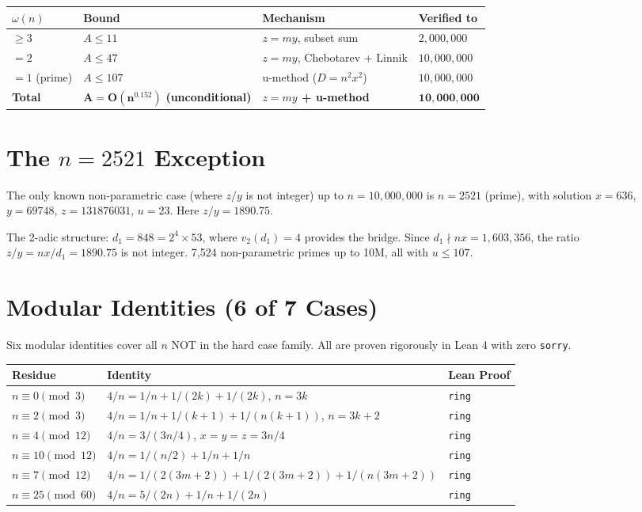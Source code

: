 \documentclass[11pt]{article}
\theoremstyle{remark}
\begin{document}
\begin{center}
\begin{tabular}{llll}
\toprule
$\omega(n)$ & Bound & Mechanism & Verified to \\
\midrule
$\geq 3$ & $A \leq 11$ & $z=my$, subset sum & $2{,}000{,}000$ \\
$= 2$ & $A \leq 47$ & $z=my$, Chebotarev + Linnik & $10{,}000{,}000$ \\
$= 1$ (prime) & $A \leq 107$ & u-method ($D = n^2 x^2$) & $10{,}000{,}000$ \\
\midrule
\textbf{Total} & $\boldsymbol{A = O(n^{0.152})}$ \textbf{(unconditional)} & \textbf{$z=my$ + u-method} & $\mathbf{10{,}000{,}000}$ \\
\bottomrule
\end{tabular}
\end{center}

\section{The $n = 2521$ Exception}

The only known non-parametric case (where $z/y$ is not integer) up to $n = 10{,}000{,}000$ is $n = 2521$ (prime), with solution $x = 636$, $y = 69748$, $z = 131876031$, $u = 23$. Here $z/y = 1890.75$.

The 2-adic structure: $d_1 = 848 = 2^4 \times 53$, where $v_2(d_1) = 4$ provides the bridge. Since $d_1 \nmid nx = 1{,}603{,}356$, the ratio $z/y = nx/d_1 = 1890.75$ is not integer. 7,524 non-parametric primes up to 10M, all with $u \leq 107$.

\section{Modular Identities (6 of 7 Cases)}

Six modular identities cover all $n$ NOT in the hard case family. All are proven rigorously in Lean 4 with zero \texttt{sorry}.

\begin{center}
\begin{tabular}{lll}
\toprule
Residue & Identity & Lean Proof \\
\midrule
$n \equiv 0 \pmod{3}$ & $4/n = 1/n + 1/(2k) + 1/(2k)$, $n = 3k$ & \texttt{ring} \\
$n \equiv 2 \pmod{3}$ & $4/n = 1/n + 1/(k+1) + 1/(n(k+1))$, $n = 3k+2$ & \texttt{ring} \\
$n \equiv 4 \pmod{12}$ & $4/n = 3/(3n/4)$, $x=y=z=3n/4$ & \texttt{ring} \\
$n \equiv 10 \pmod{12}$ & $4/n = 1/(n/2) + 1/n + 1/n$ & \texttt{ring} \\
$n \equiv 7 \pmod{12}$ & $4/n = 1/(2(3m+2)) + 1/(2(3m+2)) + 1/(n(3m+2))$ & \texttt{ring} \\
$n \equiv 25 \pmod{60}$ & $4/n = 5/(2n) + 1/n + 1/(2n)$ & \texttt{ring} \\
\bottomrule
\end{tabular}
\end{center}
\end{document}
